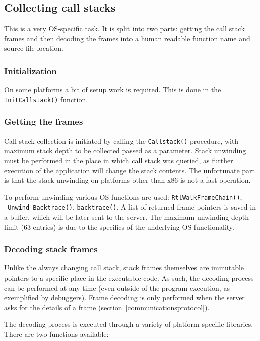 \documentclass[hidelinks,titlepage,a4paper]{article}
\begin{document}
\subsection{Collecting call stacks}
\label{collectingcallstacks}

This is a very OS-specific task. It is split into two parts: getting the call stack frames and then decoding the frames into a human readable function name and source file location.

\subsubsection{Initialization}

On some platforms a bit of setup work is required. This is done in the \texttt{InitCallstack()} function.

\subsubsection{Getting the frames}

Call stack collection is initiated by calling the \texttt{Callstack()} procedure, with maximum stack depth to be collected passed as a parameter. Stack unwinding must be performed in the place in which call stack was queried, as further execution of the application will change the stack contents. The unfortunate part is that the stack unwinding on platforms other than x86 is not a fast operation.

To perform unwinding various OS functions are used: \texttt{RtlWalkFrameChain()}, \texttt{\_Unwind\_Backtrace()}, \texttt{backtrace()}. A list of returned frame pointers is saved in a buffer, which will be later sent to the server. The maximum unwinding depth limit (63 entries) is due to the specifics of the underlying OS functionality.

\subsubsection{Decoding stack frames}

Unlike the always changing call stack, stack frames themselves are immutable pointers to a specific place in the executable code. As such, the decoding process can be performed at any time (even outside of the program execution, as exemplified by debuggers). Frame decoding is only performed when the server asks for the details of a frame (section~\ref{communicationsprotocol}).

The decoding process is executed through a variety of platform-specific libraries. There are two functions available:
\end{document}
